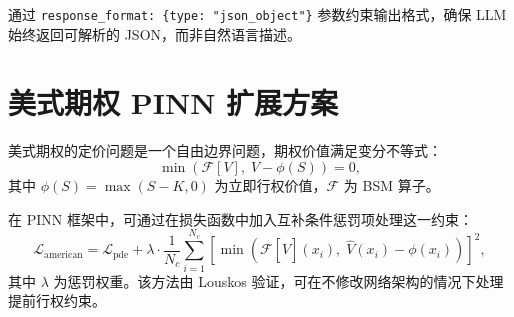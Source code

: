 通过 \texttt{response\_format: \{type: "json\_object"\}} 参数约束输出格式，确保 LLM 始终返回可解析的 JSON，而非自然语言描述。

\section{美式期权 PINN 扩展方案}\label{app:american}

美式期权的定价问题是一个自由边界问题，期权价值满足变分不等式：
\begin{equation}
  \min\left(\mathcal{F}[V],\; V - \phi(S)\right) = 0,
\end{equation}
其中 $\phi(S) = \max(S-K, 0)$ 为立即行权价值，$\mathcal{F}$ 为 BSM 算子。

在 PINN 框架中，可通过在损失函数中加入互补条件惩罚项处理这一约束：
\begin{equation}
  \mathcal{L}_\text{american} = \mathcal{L}_\text{pde}
    + \lambda \cdot \frac{1}{N_c}\sum_{i=1}^{N_c}
      \left[\min\left(\mathcal{F}[\hat{V}](x_i),\;
      \hat{V}(x_i) - \phi(x_i)\right)\right]^2,
\end{equation}
其中 $\lambda$ 为惩罚权重。该方法由 Louskos\citep{louskos2021american} 验证，可在不修改网络架构的情况下处理提前行权约束。
